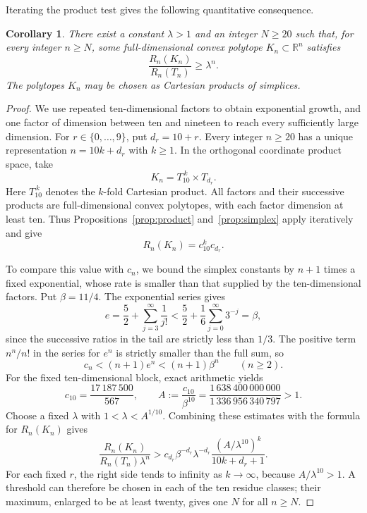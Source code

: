 \documentclass[11pt]{article}
\newtheorem{corollary}[theorem]{Corollary}
\newcommand{\R}{\mathbb R}
\begin{document}
Iterating the product test gives the following quantitative consequence.

\begin{corollary}\label{cor:exponential-excess}
There exist a constant \(\lambda>1\) and an integer \(N\ge20\) such that, for every
integer \(n\ge N\), some full-dimensional convex polytope
\(K_n\subset\R^n\) satisfies
\[
 \frac{R_n(K_n)}{R_n(T_n)}\ge\lambda^n.
\]
The polytopes \(K_n\) may be chosen as Cartesian products of simplices.
\end{corollary}

\begin{proof}
We use repeated ten-dimensional factors to obtain exponential growth,
and one factor of dimension between ten and nineteen to reach every
sufficiently large dimension. For \(r\in\{0,\ldots,9\}\), put
\(d_r=10+r\). Every integer \(n\ge20\) has a unique representation
\(n=10k+d_r\) with \(k\ge1\). In the orthogonal coordinate product
space, take
\[
 K_n=T_{10}^{\,k}\times T_{d_r}.
\]
Here \(T_{10}^{\,k}\) denotes the \(k\)-fold Cartesian product. All
factors and their successive products are full-dimensional convex
polytopes, with each factor dimension at least ten. Thus
Propositions~\ref{prop:product} and~\ref{prop:simplex} apply iteratively
and give
\[
 R_n(K_n)=c_{10}^k c_{d_r}.
\]

To compare this value with \(c_n\), we bound the simplex constants by
\(n+1\) times a fixed exponential, whose rate is smaller than that
supplied by the ten-dimensional factors. Put \(\beta=11/4\).
The exponential series gives
\[
 e=\frac52+\sum_{j=3}^{\infty}\frac1{j!}
 <\frac52+\frac16\sum_{j=0}^{\infty}3^{-j}
 =\beta,
\]
since the successive ratios in the tail are strictly less than \(1/3\).
The positive term \(n^n/n!\) in the series for \(e^n\) is strictly
smaller than the full sum, so
\[
 c_n<(n+1)e^n<(n+1)\beta^n\qquad(n\ge2).
\]
For the fixed ten-dimensional block, exact arithmetic yields
\[
 c_{10}=\frac{17\,187\,500}{567},\qquad
 A:=\frac{c_{10}}{\beta^{10}}
 =\frac{1\,638\,400\,000\,000}{1\,336\,956\,340\,797}>1.
\]
Choose a fixed \(\lambda\) with \(1<\lambda<A^{1/10}\). Combining
these estimates with the formula for \(R_n(K_n)\) gives
\[
 \frac{R_n(K_n)}{R_n(T_n)\lambda^n}
 >c_{d_r}\beta^{-d_r}\lambda^{-d_r}
   \frac{(A/\lambda^{10})^k}{10k+d_r+1}.
\]
For each fixed \(r\), the right side tends to infinity as \(k\to\infty\),
because \(A/\lambda^{10}>1\). A threshold can therefore be chosen in
each of the ten residue classes; their maximum, enlarged to be at least
twenty, gives one \(N\) for all \(n\ge N\).
\end{proof}
\end{document}
